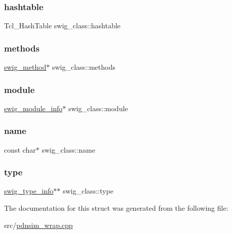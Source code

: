 \subsubsection{\texorpdfstring{hashtable}{hashtable}}
{\footnotesize\ttfamily Tcl\+\_\+\+Hash\+Table swig\+\_\+class\+::hashtable}

\mbox{\label{structswig__class_ad4a9ded260af27126bd0e2ec70b651c2}} 
\subsubsection{\texorpdfstring{methods}{methods}}
{\footnotesize\ttfamily \hyperlink{structswig__method}{swig\+\_\+method}$\ast$ swig\+\_\+class\+::methods}

\mbox{\label{structswig__class_ac8105783928c259f2b79e1329afbdcdb}} 
\subsubsection{\texorpdfstring{module}{module}}
{\footnotesize\ttfamily \hyperlink{structswig__module__info}{swig\+\_\+module\+\_\+info}$\ast$ swig\+\_\+class\+::module}

\mbox{\label{structswig__class_a4f5616c467aa85a1ee98302174a9a274}} 
\subsubsection{\texorpdfstring{name}{name}}
{\footnotesize\ttfamily const char$\ast$ swig\+\_\+class\+::name}

\mbox{\label{structswig__class_ad003f6193cbabe3b78293db9914bc3e6}} 
\subsubsection{\texorpdfstring{type}{type}}
{\footnotesize\ttfamily \hyperlink{structswig__type__info}{swig\+\_\+type\+\_\+info}$\ast$$\ast$ swig\+\_\+class\+::type}



The documentation for this struct was generated from the following file\+:\begin{DoxyCompactItemize}
\item 
src/\hyperlink{pdnsim__wrap_8cpp}{pdnsim\+\_\+wrap.\+cpp}\end{DoxyCompactItemize}
